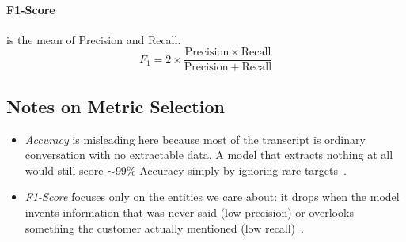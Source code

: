 \documentclass[ 
  journal=medium,
  manuscript={Contextual Information Extraction of Customer Data from Sales audio calls},
  year=2026,
  volume=0,
]{cup-journal}
\begin{document}
\paragraph{F1-Score} is the mean of Precision and Recall.
\begin{equation}
  F_1 = 2 \times \frac{\mathrm{Precision} \times \mathrm{Recall}}{\mathrm{Precision} + \mathrm{Recall}}
  \label{eq:f1}
\end{equation}

\subsection{Notes on Metric Selection}
\begin{itemize}
    \item \emph{Accuracy} is misleading here because most of the transcript is ordinary conversation with no extractable data. A model that extracts nothing at all would still score $\sim$99\% Accuracy simply by ignoring rare targets~\cite{powers2020evaluationprecisionrecallfmeasure, jeni2013facing}.
    \item \emph{F1-Score} focuses only on the entities we care about: it drops when the model invents information that was never said (low precision) or overlooks something the customer actually mentioned (low recall)~\cite{powers2020evaluationprecisionrecallfmeasure}.
\end{itemize}

\printendnotes


\printbibliography[prenote={preamble}]
\end{document}
